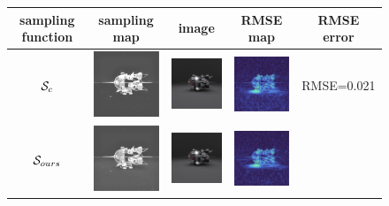\documentclass{classeENS}
\begin{document}
\begin{figure}[H]
    \centering
    \begin{tabular}{|c|ccc|c|}
    \hline
    sampling function & sampling map & image & RMSE map & RMSE error\\
    \hline
    $\mathcal S_{c}$ 
    & \includegraphics[width=30mm]{image/final/smDARS.png}
    & \includegraphics[width=30mm]{image/final/dars.png}
    & \includegraphics[width=30mm]{image/final/errorDARS.png} 
    & RMSE=0.021 \\
    \hline
    $\mathcal S_{ours}$ 
    & \includegraphics[width=30mm]{image/final/smMy.png}
    & \includegraphics[width=30mm]{image/final/my.png}
    & \includegraphics[width=30mm]{image/final/errorMy.png} 

\end{tabular}
\end{figure}
\end{document}
